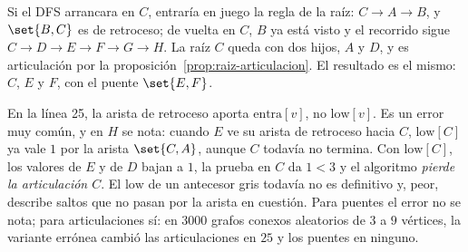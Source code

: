 \documentclass[11pt,letterpaper]{article}
\begin{document}
\begin{ejemplo}
  Si el DFS arrancara en $C$, entraría en juego la regla de la raíz:
  $C \to A \to B$, y $\set{B, C}$ es de retroceso; de vuelta en $C$,
  $B$ ya está visto y el recorrido sigue
  $C \to D \to E \to F \to G \to H$. La raíz $C$ queda con dos hijos,
  $A$ y $D$, y es articulación por la
  proposición~\ref{prop:raiz-articulacion}. El resultado es el mismo:
  $C$, $E$ y $F$, con el puente $\set{E, F}$.
\end{ejemplo}

\begin{ojo}
  En la línea 25, la arista de retroceso aporta $\text{entra}[v]$, no
  $\text{low}[v]$. Es un error muy común, y en $H$ se nota: cuando $E$
  ve su arista de retroceso hacia $C$, $\text{low}[C]$ ya vale $1$ por
  la arista $\set{C, A}$, aunque $C$ todavía no termina. Con
  $\text{low}[C]$, los valores de $E$ y de $D$ bajan a $1$, la prueba
  en $C$ da $1 < 3$ y el algoritmo \emph{pierde la articulación $C$}.
  El $\text{low}$ de un antecesor gris todavía no es definitivo y,
  peor, describe saltos que no pasan por la arista en cuestión. Para
  puentes el error no se nota; para articulaciones sí: en $3000$ grafos
  conexos aleatorios de $3$ a $9$ vértices, la variante errónea cambió
  las articulaciones en $25$ y los puentes en ninguno.
\end{ojo}
\end{document}
